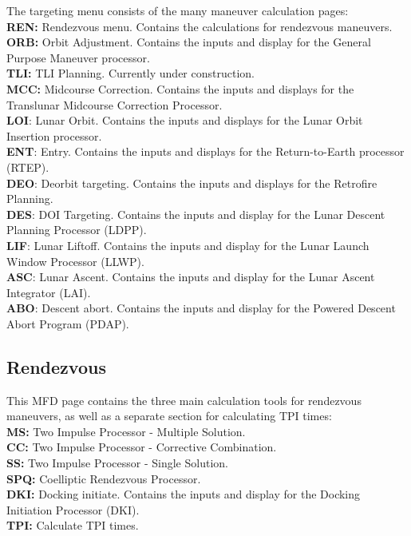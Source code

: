 \documentclass[11pt]{article} %
\begin{document}
The targeting menu consists of the many maneuver calculation pages:\\
\textbf{REN:} Rendezvous menu. Contains the calculations for rendezvous maneuvers.\\
\textbf{ORB:} Orbit Adjustment. Contains the inputs and display for the General Purpose Maneuver processor.\\
\textbf{TLI:} TLI Planning. Currently under construction.\\
\textbf{MCC:} Midcourse Correction. Contains the inputs and displays for the Translunar Midcourse Correction Processor.\\
\textbf{LOI}: Lunar Orbit. Contains the inputs and displays for the Lunar Orbit Insertion processor.\\
\textbf{ENT}: Entry. Contains the inputs and displays for the Return-to-Earth processor (RTEP).\\
\textbf{DEO}: Deorbit targeting. Contains the inputs and displays for the Retrofire Planning.\\
\textbf{DES}: DOI Targeting. Contains the inputs and display for the Lunar Descent Planning Processor (LDPP).\\
\textbf{LIF}: Lunar Liftoff. Contains the inputs and display for the Lunar Launch Window Processor (LLWP).\\
\textbf{ASC}: Lunar Ascent. Contains the inputs and display for the Lunar Ascent Integrator (LAI).\\
\textbf{ABO}: Descent abort. Contains the inputs and display for the Powered Descent Abort Program (PDAP).\\

\subsection{Rendezvous}

This MFD page contains the three main calculation tools for rendezvous maneuvers, as well as a separate section for calculating TPI times:\\

\textbf{MS:} Two Impulse Processor - Multiple Solution.\\ 
\textbf{CC:} Two Impulse Processor - Corrective Combination.\\ 
\textbf{SS:}  Two Impulse Processor - Single Solution.\\ 
\textbf{SPQ:} Coelliptic Rendezvous Processor.\\
\textbf{DKI:} Docking initiate. Contains the inputs and display for the Docking Initiation Processor (DKI).\\ 
\textbf{TPI:} Calculate TPI times.\\ 
\end{document}
